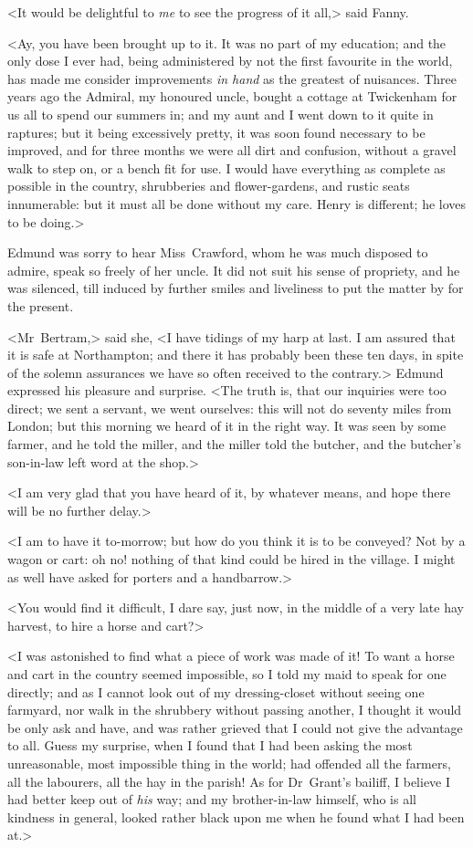 <It would be delightful to \textit{me}  to see the progress of it all,> said Fanny.

<Ay, you have been brought up to it. It was no part of my education; and the only dose I ever had, being administered by not the first favourite in the world, has made me consider improvements \textit{in hand}  as the greatest of nuisances. Three years ago the Admiral, my honoured uncle, bought a cottage at Twickenham for us all to spend our summers in; and my aunt and I went down to it quite in raptures; but it being excessively pretty, it was soon found necessary to be improved, and for three months we were all dirt and confusion, without a gravel walk to step on, or a bench fit for use. I would have everything as complete as possible in the country, shrubberies and flower-gardens, and rustic seats innumerable: but it must all be done without my care. Henry is different; he loves to be doing.>

Edmund was sorry to hear Miss~Crawford, whom he was much disposed to admire, speak so freely of her uncle. It did not suit his sense of propriety, and he was silenced, till induced by further smiles and liveliness to put the matter by for the present.

<Mr~Bertram,> said she, <I have tidings of my harp at last. I am assured that it is safe at Northampton; and there it has probably been these ten days, in spite of the solemn assurances we have so often received to the contrary.> Edmund expressed his pleasure and surprise. <The truth is, that our inquiries were too direct; we sent a servant, we went ourselves: this will not do seventy miles from London; but this morning we heard of it in the right way. It was seen by some farmer, and he told the miller, and the miller told the butcher, and the butcher's son-in-law left word at the shop.>

<I am very glad that you have heard of it, by whatever means, and hope there will be no further delay.>

<I am to have it to-morrow; but how do you think it is to be conveyed? Not by a wagon or cart: oh no! nothing of that kind could be hired in the village. I might as well have asked for porters and a handbarrow.>

<You would find it difficult, I dare say, just now, in the middle of a very late hay harvest, to hire a horse and cart?>

<I was astonished to find what a piece of work was made of it! To want a horse and cart in the country seemed impossible, so I told my maid to speak for one directly; and as I cannot look out of my dressing-closet without seeing one farmyard, nor walk in the shrubbery without passing another, I thought it would be only ask and have, and was rather grieved that I could not give the advantage to all. Guess my surprise, when I found that I had been asking the most unreasonable, most impossible thing in the world; had offended all the farmers, all the labourers, all the hay in the parish! As for Dr~Grant's bailiff, I believe I had better keep out of \textit{his}  way; and my brother-in-law himself, who is all kindness in general, looked rather black upon me when he found what I had been at.>

